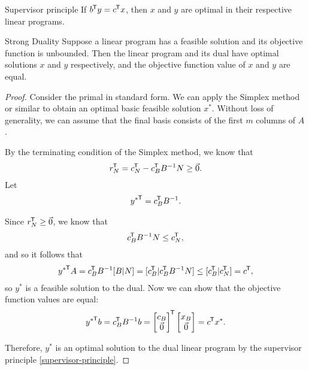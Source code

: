 \begin{cor}{Supervisor principle}\label{supervisor-principle}\proofbreak
    If $b^{\mkern-1.5mu\mathsf{T}}y = c^{\mkern-1.5mu\mathsf{T}}x$, then $x$ and $y$ are optimal in their respective linear programs.
\end{cor}

\begin{thm}{Strong Duality}\label{strong-duality}\proofbreak
    Suppose a linear program has a feasible solution and its objective function is unbounded. Then the linear program and its dual have optimal solutions $x$ and $y$ respectively, and the objective function value of $x$ and $y$ are equal.
\end{thm}

\begin{proof}
    Consider the primal in standard form. We can apply the Simplex method or similar to obtain an optimal basic feasible solution $x^*$. Without loss of generality, we can assume that the final basis consists of the first $m$ columns of $A$.

    By the terminating condition of the Simplex method, we know that
    \begin{align*}
        r_N^{\mkern-1.5mu\mathsf{T}} = c_N^{\mkern-1.5mu\mathsf{T}} - c_B^{\mkern-1.5mu\mathsf{T}}B^{-1}N \geq \vec{0}.
    \end{align*}
    Let
    \begin{align*}
        {y^*}^{\mkern-1.5mu\mathsf{T}} = c_B^{\mkern-1.5mu\mathsf{T}}B^{-1}.
    \end{align*}

    Since $r_N^{\mkern-1.5mu\mathsf{T}} \geq \vec{0}$, we know that
    \begin{align*}
        c_B^{\mkern-1.5mu\mathsf{T}}B^{-1}N \leq c_N^{\mkern-1.5mu\mathsf{T}},
    \end{align*}
    and so it follows that
    \begin{align*}
        {y^*}^{\mkern-1.5mu\mathsf{T}}A = c_B^{\mkern-1.5mu\mathsf{T}}B^{-1}[B|N] = [c_B^{\mkern-1.5mu\mathsf{T}}|c_B^{\mkern-1.5mu\mathsf{T}}B^{-1}N] \leq [c_B^{\mkern-1.5mu\mathsf{T}}|c_N^{\mkern-1.5mu\mathsf{T}}] = c^{\mkern-1.5mu\mathsf{T}},
    \end{align*}
    so $y^*$ is a feasible solution to the dual. Now we can show that the objective function values are equal:
    \begin{align*}
        {y^{*}}^{\mkern-1.5mu\mathsf{T}}b = c_B^{\mkern-1.5mu\mathsf{T}}B^{-1}b = \begin{bmatrix}c_B \\ \vec{0}\end{bmatrix}^{\mkern-1.5mu\mathsf{T}}\begin{bmatrix}x_B \\ \vec{0}\end{bmatrix} = c^{\mkern-1.5mu\mathsf{T}}x^*.
    \end{align*}

    Therefore, $y^*$ is an optimal solution to the dual linear program by the supervisor principle \ref{supervisor-principle}.
\end{proof}
